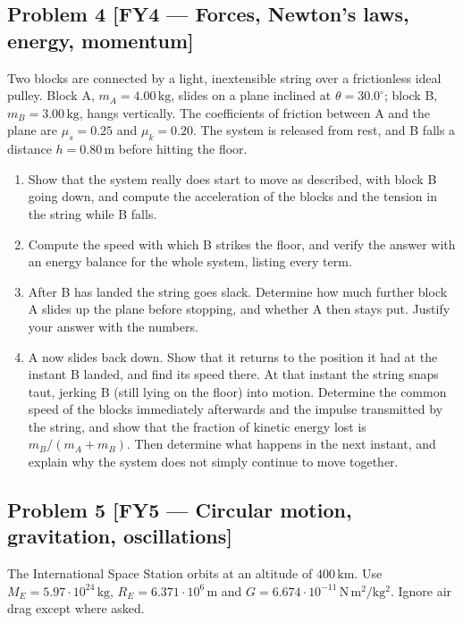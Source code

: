 \documentclass[11pt,a4paper]{article}
\newcommand{\problem}[3]{%
  \subsection*{Problem #1 \;\textnormal{\small[#2]}}\label{prob:#3}%
}
\newcommand{\unit}[1]{\,\mathrm{#1}}
\newenvironment{parts}{\begin{enumerate}[label=\textbf{\alph*)}]}{\end{enumerate}}
\begin{document}
\problem{4}{FY4 --- Forces, Newton's laws, energy, momentum}{fy4}

Two blocks are connected by a light, inextensible string over a frictionless
ideal pulley. Block A, $m_A=4.00\unit{kg}$, slides on a plane inclined at
$\theta=30.0^\circ$; block B, $m_B=3.00\unit{kg}$, hangs vertically. The
coefficients of friction between A and the plane are $\mu_s=0.25$ and
$\mu_k=0.20$. The system is released from rest, and B falls a distance
$h=0.80\unit{m}$ before hitting the floor.

\begin{parts}
\item Show that the system really does start to move as described, with block
      B going down, and compute the acceleration of the blocks and the
      tension in the string while B falls.
\item Compute the speed with which B strikes the floor, and verify the answer
      with an energy balance for the whole system, listing every term.
\item After B has landed the string goes slack. Determine how much further
      block A slides up the plane before stopping, and whether A then stays
      put. Justify your answer with the numbers.
\item A now slides back down. Show that it returns to the position it had at
      the instant B landed, and find its speed there. At that instant the
      string snaps taut, jerking B (still lying on the floor) into motion.
      Determine the common speed of the blocks immediately afterwards and the
      impulse transmitted by the string, and show that the fraction of
      kinetic energy lost is $m_B/(m_A+m_B)$. Then determine what happens in
      the next instant, and explain why the system does not simply continue
      to move together.
\end{parts}

\problem{5}{FY5 --- Circular motion, gravitation, oscillations}{fy5}

The International Space Station orbits at an altitude of $400\unit{km}$. Use
$M_E=5.97\cdot10^{24}\unit{kg}$, $R_E=6.371\cdot10^{6}\unit{m}$ and
$G=6.674\cdot10^{-11}\unit{N\,m^2/kg^2}$. Ignore air drag except where asked.
\end{document}
